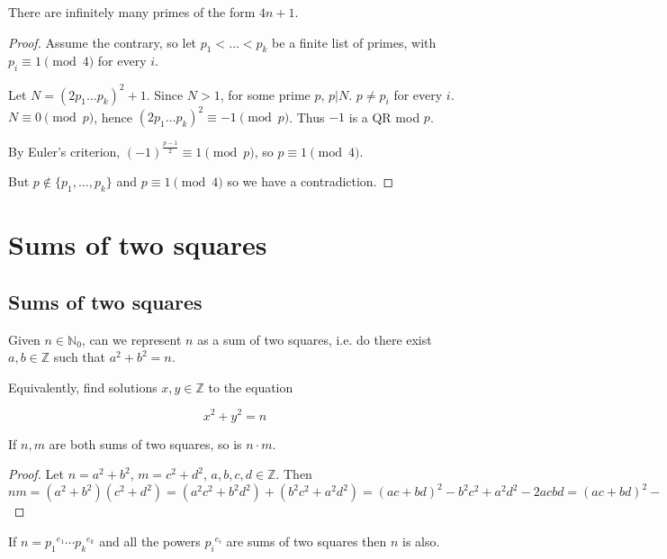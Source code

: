 \begin{theorem}
	There are infinitely many primes of the form $4n + 1$.
\end{theorem}

\begin{proof}
	Assume the contrary, so let $p_1 < \dots < p_k$ be a finite list of primes, with $p_i \equiv 1 \pmod{4}$ for every $i$.

	Let $N = (2p_1 \dots p_k)^2 + 1$. Since $N > 1$, for some prime $p$, $p | N$. $p \ne p_i$ for every $i$. $N \equiv 0 \pmod{p}$, hence $(2p_1 \dots p_k)^2 \equiv -1 \pmod{p}$. Thus $-1$ is a QR mod $p$.

	By Euler's criterion, $(-1)^{\frac{p - 1}{2}} \equiv 1 \pmod{p}$, so $p \equiv 1 \pmod{4}$.

	But $p \notin \{p_1, \dots, p_k\}$ and $p \equiv 1 \pmod{4}$ so we have a contradiction.
\end{proof}

\break

\section{Sums of two squares}

\subsection{Sums of two squares}

Given $n \in \mathbb{N}_0$, can we represent $n$ as a sum of two squares, i.e. do there exist $a, b \in \mathbb{Z}$ such that $a^2 + b^2 = n$.

Equivalently, find solutions $x, y \in \mathbb{Z}$ to the equation

\[x^2 + y^2 = n\]

\begin{lemma}
	If $n, m$ are both sums of two squares, so is $n \cdot m$.
\end{lemma}

\begin{proof}
	Let $n = a^2 + b^2$, $m = c^2 + d^2$, $a, b, c, d \in \mathbb{Z}$. Then $nm = (a^2 + b^2)(c^2 + d^2) = (a^2 c^2 + b^2 d^2) + (b^2 c^2 + a^2 d^2) = (ac + bd)^2 - b^2 c^2 + a^2 d^2 - 2acbd = (ac + bd)^2 - (ad - bc)^2$
\end{proof}

\begin{corollary}
	If $n = {p_1}^{e_1} \cdots {p_k}^{e_k}$ and all the powers ${p_i}^{e_i}$ are sums of two squares then $n$ is also.
\end{corollary}


